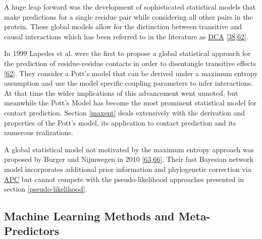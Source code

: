 \documentclass[11pt,a4paper,twoside]{book}
\theoremstyle{definition}
\theoremstyle{definition}
\theoremstyle{remark}
\begin{document}
A huge leap forward was the development of sophisticated statistical
models that make predictions for a single residue pair while considering
all other pairs in the protein. These global models allow for the
distinction between transitive and causal interactions which has been
referred to in the literature as \protect\hyperlink{abbrev}{DCA}
{[}\protect\hyperlink{ref-Weigt2009}{38},\protect\hyperlink{ref-Lapedes1999}{62}{]}.

In 1999 Lapedes et al. were the first to propose a global statistical
approach for the prediction of residue-residue contacts in order to
disentangle transitive effects
{[}\protect\hyperlink{ref-Lapedes1999}{62}{]}. They consider a Pott's
model that can be derived under a maximum entropy assumption and use the
model specific coupling parameters to infer interactions. At that time
the wider implications of this advancement went unnoted, but meanwhile
the Pott's Model has become the most prominent statistical model for
contact prediction. Section \ref{maxent} deals extensively with the
derivation and properties of the Pott's model, its application to
contact prediction and its numerous realizations.

A global statistical model not motivated by the maximum entropy approach
was proposed by Burger and Nijmwegen in 2010
{[}\protect\hyperlink{ref-Burger2010}{63},\protect\hyperlink{ref-Burger2008}{66}{]}.
Their fast Bayesian network model incorporates additional prior
information and phylogenetic correction via
\protect\hyperlink{abbrev}{APC} but cannot compete with the
pseudo-likelihood approaches presented in section
\ref{pseudo-likelihood}.

\subsection{Machine Learning Methods and
Meta-Predictors}\label{meta-predictors}
\end{document}
